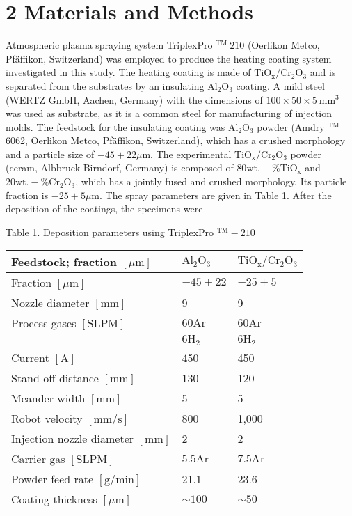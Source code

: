 \documentclass[10pt]{article}
\begin{document}
\section*{2 Materials and Methods}
Atmospheric plasma spraying system TriplexPro ${ }^{\text {TM }} 210$ (Oerlikon Metco, Pfäffikon, Switzerland) was employed to produce the heating coating system investigated in this study. The heating coating is made of $\mathrm{TiO}_{\mathrm{x}} / \mathrm{Cr}_{2} \mathrm{O}_{3}$ and is separated from the substrates by an insulating $\mathrm{Al}_{2} \mathrm{O}_{3}$ coating. A mild steel (WERTZ GmbH, Aachen, Germany) with the dimensions of $100 \times 50 \times 5 \mathrm{~mm}^{3}$ was used as substrate, as it is a common steel for manufacturing of injection molds. The feedstock for the insulating coating was $\mathrm{Al}_{2} \mathrm{O}_{3}$ powder (Amdry ${ }^{\text {TM }}$ 6062, Oerlikon Metco, Pfäffikon, Switzerland), which has a crushed morphology and a particle size of $-45+22 \mu \mathrm{m}$. The experimental $\mathrm{TiO}_{\mathrm{x}} / \mathrm{Cr}_{2} \mathrm{O}_{3}$ powder (ceram, Albbruck-Birndorf, Germany) is composed of $80 \mathrm{wt} .-\% \mathrm{TiO}_{\mathrm{x}}$ and $20 \mathrm{wt} .-\% \mathrm{Cr}_{2} \mathrm{O}_{3}$, which has a jointly fused and crushed morphology. Its particle fraction is $-25+5 \mu \mathrm{m}$. The spray parameters are given in Table 1. After the deposition of the coatings, the specimens were

Table 1. Deposition parameters using TriplexPro ${ }^{\mathrm{TM}}-210$

\begin{center}
\begin{tabular}{l|l|l}
\hline
Feedstock; fraction $[\mu \mathrm{m}]$ & $\mathrm{Al}_{2} \mathrm{O}_{3}$ & $\mathrm{TiO}_{\mathrm{x}} / \mathrm{Cr}_{2} \mathrm{O}_{3}$ \\
\hline
Fraction $[\mu \mathrm{m}]$ & $-45+22$ & $-25+5$ \\
\hline
Nozzle diameter $[\mathrm{mm}]$ & 9 & 9 \\
\hline
Process gases $[\mathrm{SLPM}]$ & $60 \mathrm{Ar}$ & $60 \mathrm{Ar}$ \\
\hline
 & $6 \mathrm{H}_{2}$ & $6 \mathrm{H}_{2}$ \\
\hline
Current $[\mathrm{A}]$ & 450 & 450 \\
\hline
Stand-off distance $[\mathrm{mm}]$ & 130 & 120 \\
\hline
Meander width $[\mathrm{mm}]$ & 5 & 5 \\
\hline
Robot velocity $[\mathrm{mm} / \mathrm{s}]$ & 800 & 1,000 \\
\hline
Injection nozzle diameter $[\mathrm{mm}]$ & 2 & 2 \\
\hline
Carrier gas $[\mathrm{SLPM}]$ & $5.5 \mathrm{Ar}$ & $7.5 \mathrm{Ar}$ \\
\hline
Powder feed rate $[\mathrm{g} / \mathrm{min}]$ & 21.1 & 23.6 \\
\hline
Coating thickness $[\mu \mathrm{m}]$ & $\sim 100$ & $\sim 50$ \\
\hline
\end{tabular}
\end{center}
\end{document}

